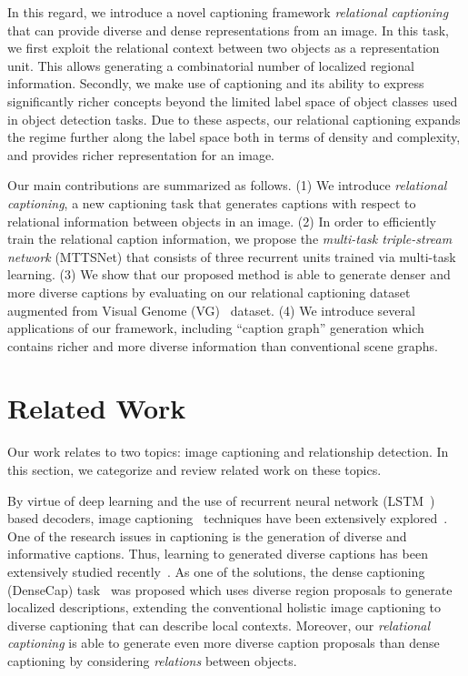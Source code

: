\documentclass[10pt,twocolumn,letterpaper]{article}
\begin{document}
In this regard, we introduce a novel captioning framework \emph{relational captioning} that can provide diverse and dense representations from an image.
In this task, we first exploit the relational context between two objects as a representation unit.
This allows generating a combinatorial number of localized regional information.
Secondly, we make use of captioning and its ability to express significantly richer concepts beyond the limited label space of object classes used in object detection tasks.
Due to these aspects, our relational captioning expands the regime further along the label space both in terms of density and complexity, and provides richer representation for an image.







Our main contributions are summarized as follows.
(1) We introduce \emph{relational captioning}, a new {captioning} task that generates captions with respect to relational information between objects in an image.
(2) In order to efficiently train the relational caption information, we propose the \emph{multi-task triple-stream network} (MTTSNet) that consists of three recurrent units trained via multi-task learning.
(3) {We show that our proposed method is able to generate denser and more diverse captions by evaluating on our relational captioning dataset augmented from Visual Genome (VG)~\cite{krishna2017visual} dataset.}
(4) We introduce {several applications of our framework, including} ``caption graph'' generation which contains richer and more diverse information than conventional scene graphs.

 


\section{Related Work}
Our work relates to two topics: image captioning and relationship detection.
In this section, we categorize and review related work on these topics.

By virtue of deep learning and the use of recurrent neural network (\eg LSTM~\cite{hochreiter1997long}) based decoders, image captioning~\cite{ordonez2011im2text} techniques have been extensively explored~\cite{anderson2018bottom,donahue2015long,jiang2018recurrent,karpathy2015deep,lu2016knowing,rennie2017self,vinyals2015show,xu2015show,yao2018exploring,you2016image}.
One of the research issues in captioning is the generation of diverse and informative captions. Thus, learning to generated diverse captions has been extensively studied recently~\cite{chen2018groupcap,dai2017towards,dai2017contrastive,shetty2017speaking,venugopalan2017captioning,wang2017diverse}.
As one of the solutions, the dense captioning (DenseCap) task~\cite{johnson2016densecap} was proposed which uses diverse region proposals to generate localized descriptions, extending the conventional holistic image captioning to diverse captioning that can describe local contexts. 
{Moreover, our \emph{relational captioning} is able to generate even more diverse caption proposals than dense captioning by considering \emph{relations} between objects.}
\end{document}
